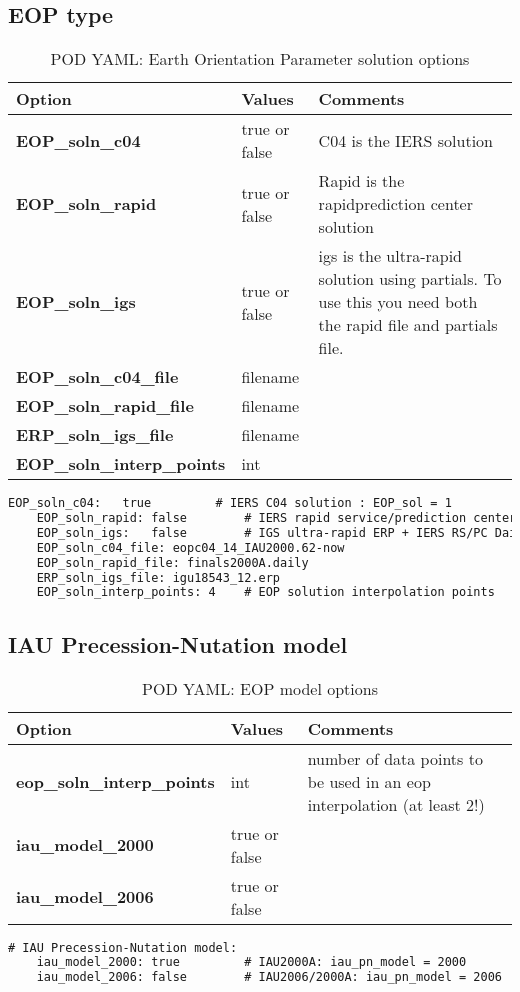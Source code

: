 \subsection{EOP type}
\begin{table}[h!]
	\begin{tabular}{|p{4.5cm}|p{2cm}|p{3.5cm}|}
		\hline
		Option & Values & Comments \\
		\hline
		\textbf{EOP\_soln\_c04} & true or false & C04 is the IERS solution\\
		\textbf{EOP\_soln\_rapid} & true or false & Rapid is the rapid\/prediction center solution\\
		\textbf{EOP\_soln\_igs} & true or false & igs is the ultra-rapid solution using partials. To use this you need both the rapid file and partials file.\\
		\textbf{EOP\_soln\_c04\_file} & filename & \\
		\textbf{EOP\_soln\_rapid\_file} & filename & \\
		\textbf{ERP\_soln\_igs\_file} & filename & \\
		\textbf{EOP\_soln\_interp\_points} & int & \\
		\hline
	\end{tabular}
	\caption{POD YAML: Earth Orientation Parameter solution options}
	\label{table:pod_yaml_eop_sol}
\end{table}
%
\begin{lstlisting}[language=xml,caption=eop estimation options]
   	EOP_soln_c04:   true         # IERS C04 solution : EOP_sol = 1
	EOP_soln_rapid: false        # IERS rapid service/prediction center (RS/PC) Daily : EOP_sol = 2
	EOP_soln_igs:   false        # IGS ultra-rapid ERP + IERS RS/PC Daily (dX,dY) : EOP_sol = 3. Need both rapid_file AND igs_file
	EOP_soln_c04_file: eopc04_14_IAU2000.62-now
	EOP_soln_rapid_file: finals2000A.daily
	ERP_soln_igs_file: igu18543_12.erp
	EOP_soln_interp_points: 4    # EOP solution interpolation points
\end{lstlisting}
%
\subsection{IAU Precession-Nutation model}
\begin{table}[h!]
	\begin{tabular}{|p{4.5cm}|p{2cm}|p{3.5cm}|}
		\hline
		Option & Values & Comments \\
		\hline
        \textbf{eop\_soln\_interp\_points} & int & number of data points to be used in an eop interpolation (at least 2!)\\
        \textbf{iau\_model\_2000} & true or false & \\
        \textbf{iau\_model\_2006} & true or false & \\
		\hline
	\end{tabular}
	\caption{POD YAML: EOP model options}
	\label{table:pod_yaml_eop_model}
\end{table}
%
	\begin{lstlisting}[language=xml,caption=eop model]
	# IAU Precession-Nutation model:
	iau_model_2000: true         # IAU2000A: iau_pn_model = 2000
	iau_model_2006: false        # IAU2006/2000A: iau_pn_model = 2006
	\end{lstlisting}
%
